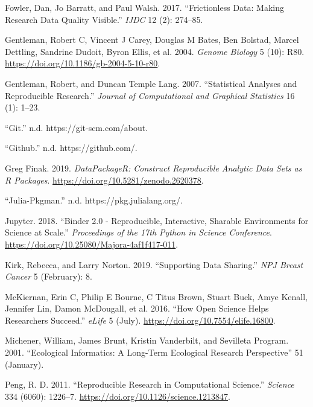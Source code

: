 \documentclass[
]{article}
\newlength{\cslhangindent}
\newenvironment{cslreferences}%
  {\setlength{\parindent}{0pt}%
  \everypar{\setlength{\hangindent}{\cslhangindent}}\ignorespaces}%
  {\par}
\begin{document}
\begin{cslreferences}
\leavevmode\hypertarget{ref-Fowler2017}{}%
Fowler, Dan, Jo Barratt, and Paul Walsh. 2017. ``Frictionless Data: Making Research Data Quality Visible.'' \emph{IJDC} 12 (2): 274--85.

\leavevmode\hypertarget{ref-Gentleman2004}{}%
Gentleman, Robert C, Vincent J Carey, Douglas M Bates, Ben Bolstad, Marcel Dettling, Sandrine Dudoit, Byron Ellis, et al. 2004. \emph{Genome Biology} 5 (10): R80. \url{https://doi.org/10.1186/gb-2004-5-10-r80}.

\leavevmode\hypertarget{ref-gentleman2007statistical}{}%
Gentleman, Robert, and Duncan Temple Lang. 2007. ``Statistical Analyses and Reproducible Research.'' \emph{Journal of Computational and Graphical Statistics} 16 (1): 1--23.

\leavevmode\hypertarget{ref-git}{}%
``Git.'' n.d. https://git-scm.com/about.

\leavevmode\hypertarget{ref-github}{}%
``Github.'' n.d. https://github.com/.

\leavevmode\hypertarget{ref-DataPackageR}{}%
Greg Finak. 2019. \emph{DataPackageR: Construct Reproducible Analytic Data Sets as R Packages}. \url{https://doi.org/10.5281/zenodo.2620378}.

\leavevmode\hypertarget{ref-julia-pkgman}{}%
``Julia-Pkgman.'' n.d. https://pkg.julialang.org/.

\leavevmode\hypertarget{ref-Jupyter2018}{}%
Jupyter. 2018. ``Binder 2.0 - Reproducible, Interactive, Sharable Environments for Science at Scale.'' \emph{Proceedings of the 17th Python in Science Conference}. \url{https://doi.org/10.25080/Majora-4af1f417-011}.

\leavevmode\hypertarget{ref-Kirk2019}{}%
Kirk, Rebecca, and Larry Norton. 2019. ``Supporting Data Sharing.'' \emph{NPJ Breast Cancer} 5 (February): 8.

\leavevmode\hypertarget{ref-McKiernan2016}{}%
McKiernan, Erin C, Philip E Bourne, C Titus Brown, Stuart Buck, Amye Kenall, Jennifer Lin, Damon McDougall, et al. 2016. ``How Open Science Helps Researchers Succeed.'' \emph{eLife} 5 (July). \url{https://doi.org/10.7554/elife.16800}.

\leavevmode\hypertarget{ref-Michener2001}{}%
Michener, William, James Brunt, Kristin Vanderbilt, and Sevilleta Program. 2001. ``Ecological Informatics: A Long-Term Ecological Research Perspective'' 51 (January).

\leavevmode\hypertarget{ref-Peng2011}{}%
Peng, R. D. 2011. ``Reproducible Research in Computational Science.'' \emph{Science} 334 (6060): 1226--7. \url{https://doi.org/10.1126/science.1213847}.


\end{cslreferences}
\end{document}

